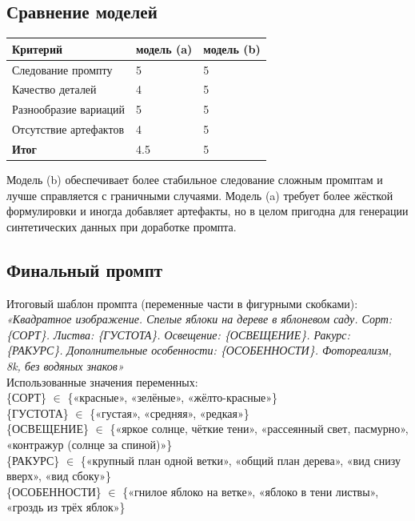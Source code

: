 \subsection{Сравнение моделей}
\begin{table}[h!]
	\centering
	\begin{tabular}{|l|p{5cm}|p{5cm}|}
		\hline
		\textbf{Критерий} & \textbf{модель (a)} & \textbf{модель (b)} \\
		\hline
		Следование промпту & 5 & 5 \\
		\hline
		Качество деталей & 4 & 5 \\
		\hline
		Разнообразие вариаций & 5 & 5 \\
		\hline
		Отсутствие артефактов  & 4 & 5 \\
		\hline
		\textbf{Итог} & 4.5 & 5\\
		\hline
	\end{tabular}
\end{table}
Модель (b) обеспечивает более стабильное следование сложным промптам и лучше справляется с граничными случаями. Модель (a) требует более жёсткой формулировки и иногда добавляет артефакты, но в целом пригодна для генерации синтетических данных при доработке промпта.
\subsection{Финальный промпт}
Итоговый шаблон промпта (переменные части в фигурными скобками): \\
\textit{«Квадратное изображение. Спелые яблоки на дереве в яблоневом саду. Сорт: \{СОРТ\}. Листва: \{ГУСТОТА\}. Освещение: \{ОСВЕЩЕНИЕ\}. Ракурс: \{РАКУРС\}. Дополнительные особенности: \{ОСОБЕННОСТИ\}. Фотореализм, 8k, без водяных знаков»} \\
\newline
Использованные значения переменных: \\
\{СОРТ\} $\in$ \{«красные», «зелёные», «жёлто-красные»\} \\
\{ГУСТОТА\} $\in$ \{«густая», «средняя», «редкая»\}\\
\{ОСВЕЩЕНИЕ\} $\in$ \{«яркое солнце, чёткие тени», «рассеянный свет, пасмурно», «контражур (солнце за спиной)»\}\\
\{РАКУРС\} $\in$ \{«крупный план одной ветки», «общий план дерева», «вид снизу вверх», «вид сбоку»\}\\
\{ОСОБЕННОСТИ\} $\in$ \{«гнилое яблоко на ветке», «яблоко в тени листвы», «гроздь из трёх яблок»\}
\newpage
